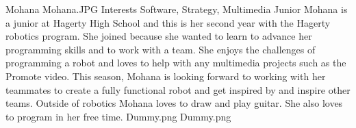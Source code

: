 \insertbio
{Mohana}
{Mohana.JPG}
{Interests}
{Software, Strategy, Multimedia}
{Junior}
{  
Mohana is a junior at Hagerty High School and this is her second year with the Hagerty robotics program. She joined because she wanted to learn to advance her programming skills and to work with a team. She enjoys the challenges of programming a robot and loves to help with any multimedia projects such as the Promote video. This season, Mohana is looking forward to working with her teammates to create a fully functional robot and get inspired by and inspire other teams. Outside of robotics Mohana loves to draw and play guitar. She also loves to program in her free time.  
}
{Dummy.png}
{Dummy.png}
